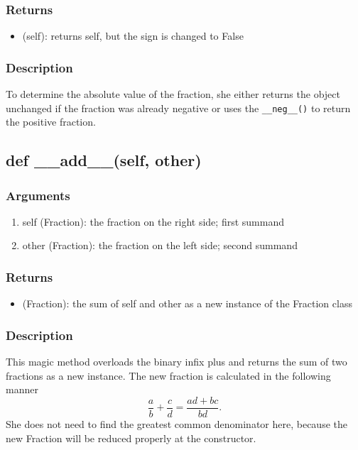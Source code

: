 \documentclass[refman]{scrartcl}
\begin{document}
\subsubsection*{Returns}

\begin{itemize}
	\item (self): returns self, but the sign is changed to False
\end{itemize}

\subsubsection*{Description}

To determine the absolute value of the fraction, she either returns the object unchanged if the fraction was already negative or uses the \texttt{\_\_neg\_\_()} to return the positive fraction.

\subsection{def \_\_add\_\_(self, other)}

\subsubsection*{Arguments}

\begin{enumerate}
	\item self (Fraction): the fraction on the right side; first summand
	\item other (Fraction): the fraction on the left side; second summand
\end{enumerate}

\subsubsection*{Returns}

\begin{itemize}
	\item (Fraction): the sum of self and other as a new instance of the Fraction class
\end{itemize}

\subsubsection*{Description}

This magic method overloads the binary infix plus and returns the sum of two fractions as a new instance. The new fraction is calculated in the following manner
%
\begin{equation}
	\frac{a}{b} + \frac{c}{d} = \frac{ad + bc}{bd} \text{.}
\end{equation}
%
She does not need to find the greatest common denominator here, because the new Fraction will be reduced properly at the constructor.
\end{document}

